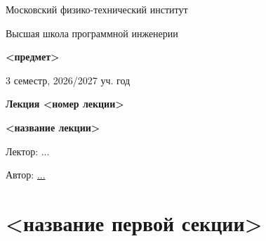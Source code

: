 \documentclass[11pt]{article}
\newcommand{\lectureNumber}{<номер лекции>}
\newcommand{\lectureTitle}{<название лекции>}
\newcommand{\courseName}{<предмет>}
\newcommand{\semester}{3 семестр, 2026/2027 уч. год}
\begin{document}
\begin{titlepage}
    \centering
    
    {\large Московский физико-технический институт \par}
    {\large Высшая школа программной инженерии \par}
    \vspace{2cm}

    {\Large \textbf{\courseName} \par}
    {\large \semester \par}
    
    \vspace*{\fill}

    {\Huge \textbf{Лекция \lectureNumber} \par}
    {\Huge \textbf{\lectureTitle} \par}
    
    \vspace*{\fill}
    
    {\large Лектор: ... \par}
    {\large Автор: \href{https://www.youtube.com/watch?v=dQw4w9WgXcQ}{...} \par}

\end{titlepage}


\section{<название первой секции>}
\end{document}
